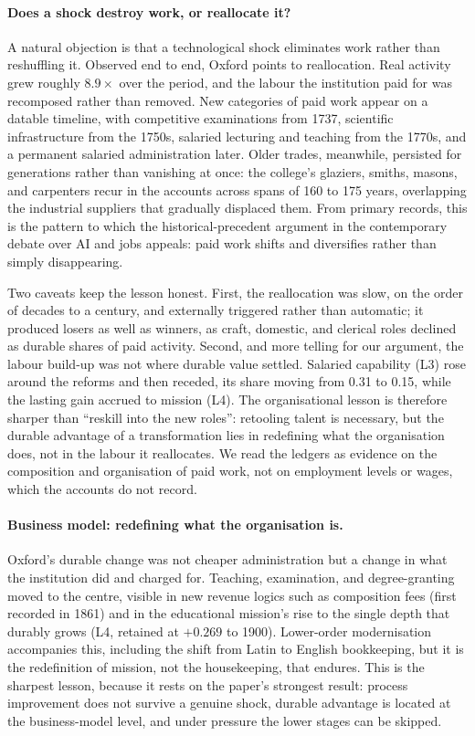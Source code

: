 \documentclass[11pt]{article}
\begin{document}
\paragraph{Does a shock destroy work, or reallocate it?} A natural objection is that a
technological shock eliminates work rather than reshuffling it. Observed end to end, Oxford points
to reallocation. Real activity grew roughly $8.9\times$ over the period, and the labour the
institution paid for was recomposed rather than removed. New categories of paid work appear on a
datable timeline, with competitive examinations from 1737, scientific infrastructure from the
1750s, salaried lecturing and teaching from the 1770s, and a permanent salaried administration
later. Older
trades, meanwhile, persisted for generations rather than vanishing at once: the college's
glaziers, smiths, masons, and carpenters recur in the accounts across spans of 160 to 175 years,
overlapping the industrial suppliers that gradually displaced them. From primary records, this is
the pattern to which the historical-precedent argument in the contemporary debate over AI and jobs
appeals: paid work shifts and diversifies rather than simply disappearing.

Two caveats keep the lesson honest. First, the reallocation was slow, on the order of decades to a
century, and externally triggered rather than automatic; it produced losers as well as winners, as
craft, domestic, and clerical roles declined as durable shares of paid activity. Second, and more
telling for our argument, the labour build-up was not where durable value settled. Salaried
capability (L3) rose around the reforms and then receded, its share moving from 0.31 to 0.15,
while the lasting gain accrued to mission (L4). The organisational lesson is therefore sharper than
``reskill into the new roles'': retooling talent is necessary, but the durable advantage of a
transformation lies in redefining what the organisation does, not in the labour it reallocates. We
read the ledgers as evidence on the composition and organisation of paid work, not on employment
levels or wages, which the accounts do not record.

\paragraph{Business model: redefining what the organisation is.} Oxford's durable change was not
cheaper administration but a change in what the institution did and charged for. Teaching,
examination, and degree-granting moved to the centre, visible in new revenue logics such as
composition fees (first recorded in 1861) and in the educational mission's rise to the single
depth that durably grows (L4, retained at $+0.269$ to 1900). Lower-order modernisation accompanies
this, including the shift from Latin to English bookkeeping, but it is the redefinition of mission,
not the housekeeping, that endures. This is the sharpest lesson, because it rests on the paper's
strongest result: process improvement does not survive a genuine shock, durable advantage is
located at the business-model level, and under pressure the lower stages can be skipped.
\end{document}
